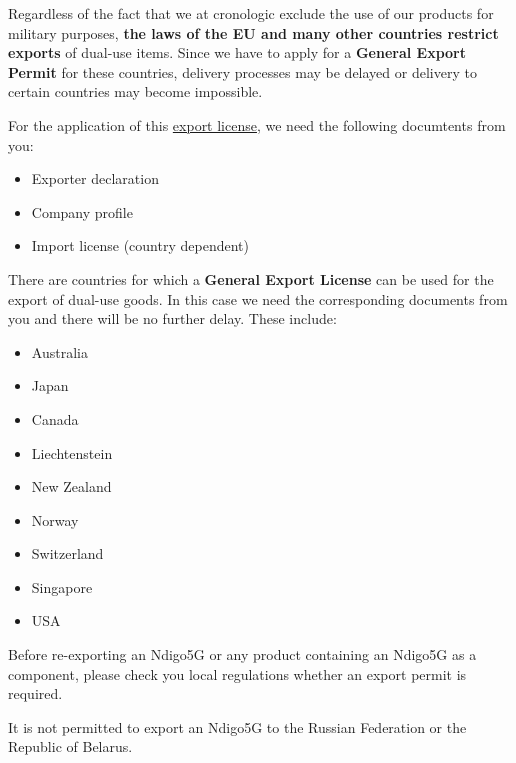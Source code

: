 Regardless of the fact that we at cronologic exclude the use of our products for military purposes, \textbf{the laws of the EU and many other countries restrict exports} of dual-use items. Since we have to apply for a \textbf{General Export Permit} for these countries, delivery processes may be delayed or delivery to certain countries may become impossible.

For the application of this \href{https://www.cronologic.de/faq/export-license}{export license}, we need the following
documtents from you:

\begin{itemize}
    \item Exporter declaration
    \item Company profile
    \item Import license (country dependent)
\end{itemize}

There are countries for which a \textbf{General Export License} can be used for the export of dual-use goods. In this case we need the corresponding documents from you and there will be no further delay. These include:
\begin{itemize}
    \item Australia
    \item Japan
    \item Canada
    \item Liechtenstein
    \item New Zealand
    \item Norway
    \item Switzerland
    \item Singapore
    \item USA
\end{itemize}

Before re-exporting an Ndigo5G or any product containing an Ndigo5G as a 
component, please check you local regulations whether an export permit is 
required.

It is not permitted to export an Ndigo5G to the Russian Federation or the 
Republic of Belarus.